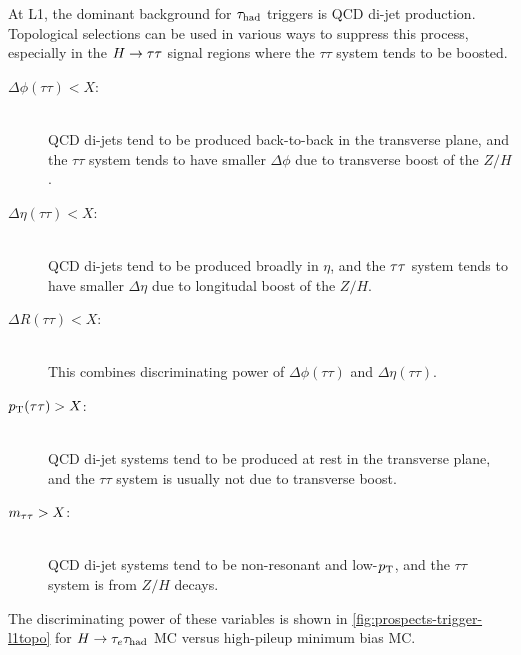 At L1, the dominant background for $\tau_\text{had}$ triggers is QCD di-jet production. Topological selections can be used in various ways to suppress this process, especially in the $H\rightarrow\tau\tau$ signal regions where the $\tau\tau$ system tends to be boosted.
%
\begin{description}
    \item[$\Delta\phi(\tau\tau) < X$:] \hfill \\
      QCD di-jets tend to be produced back-to-back in the transverse plane, and the $\tau\tau$ system tends to have smaller $\Delta\phi$ due to transverse boost of the $Z/H$.
    \item[$\Delta\eta(\tau\tau) < X$:] \hfill \\
      QCD di-jets tend to be produced broadly in $\eta$, and the $\tau\tau$ system tends to have smaller $\Delta\eta$ due to longitudal boost of the $Z/H$.
    \item[$\Delta R(\tau\tau) < X$:] \hfill \\
      This combines discriminating power of $\Delta\phi(\tau\tau)$ and $\Delta\eta(\tau\tau)$.
    \item[$p_{\mathrm{T}}(\tau\tau) > X$:] \hfill \\
      QCD di-jet systems tend to be produced at rest in the transverse plane, and the $\tau\tau$ system is usually not due to transverse boost.
    \item[$m_{\tau\tau} > X$:] \hfill \\
      QCD di-jet systems tend to be non-resonant and low-$p_{\mathrm{T}}$, and the $\tau\tau$ system is from $Z/H$ decays.
\end{description}
%
The discriminating power of these variables is shown in \cref{fig:prospects-trigger-l1topo} for $H\rightarrow\tau_e \tau_\text{had}$ MC versus high-pileup minimum bias MC. 

